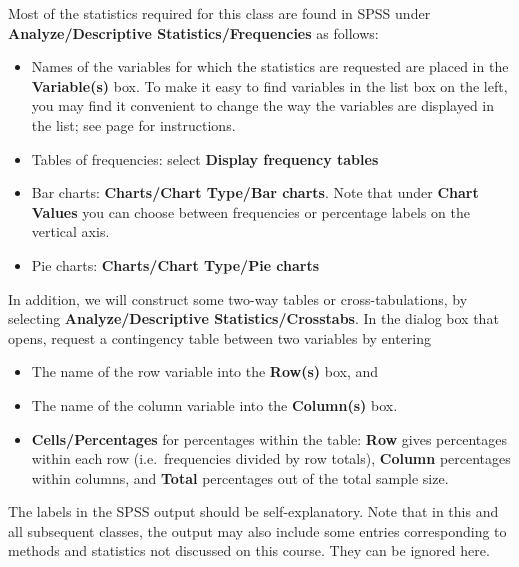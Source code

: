 Most of the statistics required for this class are found in SPSS
under \textbf{Analyze/Descriptive Statistics/Frequencies} as follows:
\begin{itemize}
\item
Names of the variables for which the statistics are requested are
placed in
the \textbf{Variable(s)} box.
To make it easy to find variables in the list box on the left, you may
find it convenient to change the
way the variables are displayed in the list; see page
\pageref{p_listoptions} for instructions.
\item
Tables of frequencies: select \textbf{Display frequency tables}
\item
Bar charts: \textbf{Charts/Chart Type/Bar charts}. Note that under \textbf{Chart Values}
you can choose between frequencies or percentage labels on the vertical axis.
\item
Pie charts: \textbf{Charts/Chart Type/Pie charts}
\end{itemize}
In addition, we will construct some two-way tables or cross-tabulations,
by selecting \textbf{Analyze/Descriptive Statistics/Crosstabs}. In the
dialog box that opens, request a contingency
table between two variables by entering
\begin{itemize}
\item
The name of the row
variable into the \textbf{Row(s)} box, and
\item
The name of the column
variable into the \textbf{Column(s)} box.
\item
\textbf{Cells/Percentages} for percentages within the table:
\textbf{Row} gives percentages within each row (i.e.\ frequencies
divided by row totals), \textbf{Column}
percentages within columns, and
\textbf{Total} percentages out of the total sample size.
\end{itemize}

The labels in the SPSS output should be self-explanatory. Note that in
this and all subsequent classes, the output may also include some
entries corresponding to methods and statistics not discussed on this
course. They can be ignored here.

